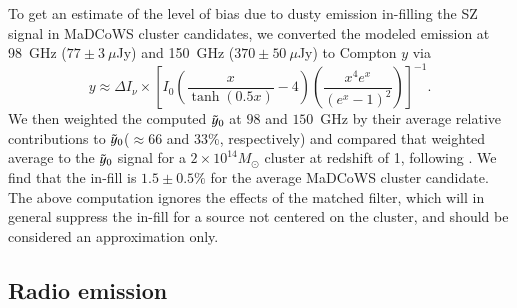 \documentclass[longauth]{aa} %
\newcommand{\madcows}{MaDCoWS\xspace}
\newcommand{\yc}{$\Tilde{\vary}_0$\xspace}
\begin{document}
To get an estimate of the level of bias due to dusty emission in-filling the SZ signal in \madcows cluster candidates, we converted the modeled emission at 98~GHz ($77\pm 3~\mu$Jy) and 150~GHz ($370\pm 50~\mu$Jy) to Compton $y$ via 
%
\begin{equation}
    y \approx \Delta I_{\nu}\times
    \left[I_0\left(\frac{x}{\tanh{(0.5x)}}-4\right)\left(\frac{x^4 e^x}{(e^x-1)^2}\right) \right]^{-1}.
\end{equation}
%
We then weighted the computed \yc at $98$ and $150$~GHz by their average relative contributions to \yc ($\approx 66$ and $33$\%, respectively) and compared that weighted average to the \yc signal for a $2\times 10^{14}M_{\odot}$ cluster at redshift of 1, following \citet{Hilton2021}. We find that the in-fill is $1.5\pm 0.5\%$ for the average \madcows cluster candidate. The above computation ignores the effects of the matched filter, which will in general suppress the in-fill for a source not centered on the cluster, and should be considered an approximation only.


\subsection{Radio emission}\label{sec:radio}
\end{document}
